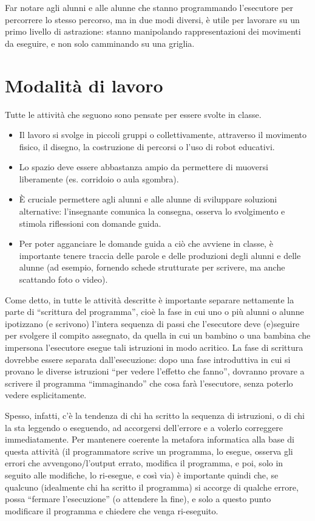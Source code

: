 Far notare agli alunni e alle alunne che stanno programmando l'esecutore per percorrere lo stesso percorso, ma in due modi diversi, è utile per lavorare su un primo livello di astrazione: stanno manipolando rappresentazioni dei movimenti da eseguire, e non solo camminando su una griglia.

\section{Modalità di lavoro }\label{modalituxe0-di-lavoro-1}

Tutte le attività che seguono sono pensate per essere svolte in classe.

\begin{itemize}
\item
  Il lavoro si svolge in piccoli gruppi o collettivamente, attraverso il movimento fisico, il disegno, la costruzione di percorsi o l'uso di robot educativi.
\item
  Lo spazio deve essere abbastanza ampio da permettere di muoversi liberamente (es. corridoio o aula sgombra).
\item
  È cruciale permettere agli alunni e alle alunne di sviluppare soluzioni alternative: l'insegnante comunica la consegna, osserva lo svolgimento e stimola riflessioni con domande guida.
\item
  Per poter agganciare le domande guida a ciò che avviene in classe, è importante tenere traccia delle parole e delle produzioni degli alunni e delle alunne (ad esempio, fornendo schede strutturate per scrivere, ma anche scattando foto o video).
\end{itemize}

Come detto, in tutte le attività descritte è importante separare nettamente la parte di ``scrittura del programma'', cioè la fase in cui uno o più alunni o alunne ipotizzano (e scrivono) l'intera sequenza di passi che l'esecutore deve (e)seguire per svolgere il compito assegnato, da quella in cui un bambino o una bambina che impersona l'esecutore esegue tali istruzioni in modo acritico. La fase di scrittura dovrebbe essere separata dall'esecuzione: dopo una fase introduttiva in cui si provano le diverse istruzioni ``per vedere l'effetto che fanno'', dovranno provare a scrivere il programma ``immaginando'' che cosa farà l'esecutore, senza poterlo vedere esplicitamente.

Spesso, infatti, c'è la tendenza di chi ha scritto la sequenza di istruzioni, o di chi la sta leggendo o eseguendo, ad accorgersi dell'errore e a volerlo correggere immediatamente. Per mantenere coerente la metafora informatica alla base di questa attività (il programmatore scrive un programma, lo esegue, osserva gli errori che avvengono/l'output errato, modifica il programma, e poi, solo in seguito alle modifiche, lo ri-esegue, e così via) è importante quindi che, se qualcuno (idealmente chi ha scritto il programma) si accorge di qualche errore, possa ``fermare l'esecuzione'' (o attendere la fine), e solo a questo punto modificare il programma e chiedere che venga ri-eseguito.

